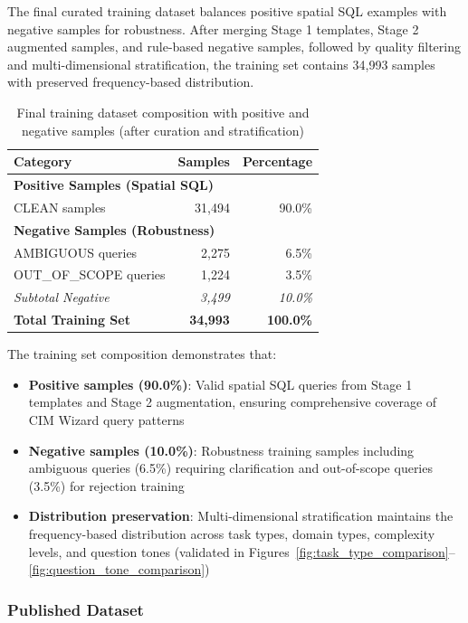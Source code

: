 The final curated training dataset balances positive spatial SQL examples with negative samples for robustness. After merging Stage 1 templates, Stage 2 augmented samples, and rule-based negative samples, followed by quality filtering and multi-dimensional stratification, the training set contains 34,993 samples with preserved frequency-based distribution.

\begin{table}%
\centering
\small
\begin{tabular}{lrr}
\toprule
\textbf{Category} & \textbf{Samples} & \textbf{Percentage} \\
\midrule
\multicolumn{3}{l}{\textbf{Positive Samples (Spatial SQL)}} \\
CLEAN samples & 31,494 & 90.0\% \\
\midrule
\multicolumn{3}{l}{\textbf{Negative Samples (Robustness)}} \\
AMBIGUOUS queries & 2,275 & 6.5\% \\
OUT\_OF\_SCOPE queries & 1,224 & 3.5\% \\
\textit{Subtotal Negative} & \textit{3,499} & \textit{10.0\%} \\
\midrule
\textbf{Total Training Set} & \textbf{34,993} & \textbf{100.0\%} \\
\bottomrule
\end{tabular}
\caption{Final training dataset composition with positive and negative samples (after curation and stratification)}
\end{table}

The training set composition demonstrates that:
\begin{itemize}[leftmargin=1.2em]
  \item \textbf{Positive samples (90.0\%)}: Valid spatial SQL queries from Stage 1 templates and Stage 2 augmentation, ensuring comprehensive coverage of CIM Wizard query patterns
  \item \textbf{Negative samples (10.0\%)}: Robustness training samples including ambiguous queries (6.5\%) requiring clarification and out-of-scope queries (3.5\%) for rejection training
  \item \textbf{Distribution preservation}: Multi-dimensional stratification maintains the frequency-based distribution across task types, domain types, complexity levels, and question tones (validated in Figures~\ref{fig:task_type_comparison}--\ref{fig:question_tone_comparison})
\end{itemize}


\subsubsection{Published Dataset}

